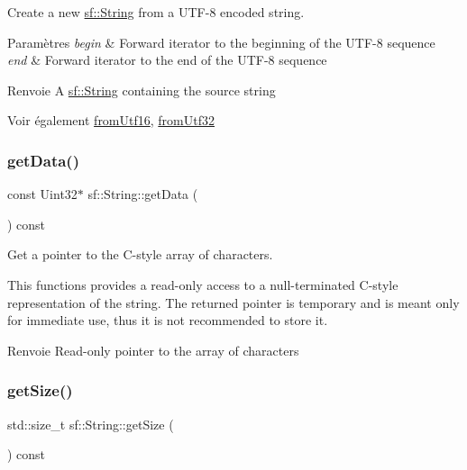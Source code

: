 Create a new \hyperlink{classsf_1_1String}{sf\+::\+String} from a U\+T\+F-\/8 encoded string. 


\begin{DoxyParams}{Paramètres}
{\em begin} & Forward iterator to the beginning of the U\+T\+F-\/8 sequence \\
\hline
{\em end} & Forward iterator to the end of the U\+T\+F-\/8 sequence\\
\hline
\end{DoxyParams}
\begin{DoxyReturn}{Renvoie}
A \hyperlink{classsf_1_1String}{sf\+::\+String} containing the source string
\end{DoxyReturn}
\begin{DoxySeeAlso}{Voir également}
\hyperlink{classsf_1_1String_a81f70eecad0000a4f2e4d66f97b80300}{from\+Utf16}, \hyperlink{classsf_1_1String_ab023a4900dce37ee71ab9e29b30a23cb}{from\+Utf32} 
\end{DoxySeeAlso}
\mbox{\label{classsf_1_1String_a0b38001f1a6b7bdf35bb180da5391929}} 
\subsubsection{\texorpdfstring{get\+Data()}{getData()}}
{\footnotesize\ttfamily const Uint32$\ast$ sf\+::\+String\+::get\+Data (\begin{DoxyParamCaption}{ }\end{DoxyParamCaption}) const}



Get a pointer to the C-\/style array of characters. 

This functions provides a read-\/only access to a null-\/terminated C-\/style representation of the string. The returned pointer is temporary and is meant only for immediate use, thus it is not recommended to store it.

\begin{DoxyReturn}{Renvoie}
Read-\/only pointer to the array of characters 
\end{DoxyReturn}
\mbox{\label{classsf_1_1String_ae7aff54e178f5d3e399953adff5cad20}} 
\subsubsection{\texorpdfstring{get\+Size()}{getSize()}}
{\footnotesize\ttfamily std\+::size\+\_\+t sf\+::\+String\+::get\+Size (\begin{DoxyParamCaption}{ }\end{DoxyParamCaption}) const}



